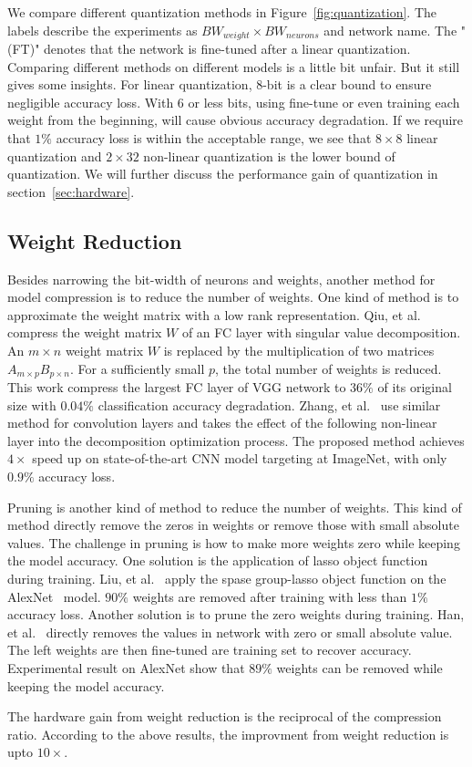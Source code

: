 We compare different quantization methods in Figure~\ref{fig:quantization}. The labels describe the experiments as $BW_{weight}\times BW_{neurons}$ and network name. The "(FT)" denotes that the network is fine-tuned after a linear quantization. Comparing different methods on different models is a little bit unfair. But it still gives some insights. For linear quantization, 8-bit is a clear bound to ensure negligible accuracy loss. With 6 or less bits, using fine-tune or even training each weight from the beginning, will cause obvious accuracy degradation. If we require that $1\%$ accuracy loss is within the acceptable range, we see that $8\times8$ linear quantization and $2\times32$ non-linear quantization is the lower bound of quantization. We will further discuss the performance gain of quantization in section~\ref{sec:hardware}. 


\subsection{Weight Reduction}\label{sec:software:wr}
Besides narrowing the bit-width of neurons and weights, another method for model compression is to reduce the number of weights. One kind of method is to approximate the weight matrix with a low rank representation. Qiu, et al.~\cite{qiu2016going} compress the weight matrix $W$ of an FC layer with singular value decomposition. An $m\times n$ weight matrix $W$ is replaced by the multiplication of two matrices $A_{m\times p}B_{p\times n}$. For a sufficiently small $p$, the total number of weights is reduced. This work compress the largest FC layer of VGG network to $36\%$ of its original size with $0.04\%$ classification accuracy degradation. Zhang, et al.~\cite{zhang2015efficient} use similar method for convolution layers and takes the effect of the following non-linear layer into the decomposition optimization process. The proposed method achieves $4\times$ speed up on state-of-the-art CNN model targeting at ImageNet, with only $0.9\%$ accuracy loss.

Pruning is another kind of method to reduce the number of weights. This kind of method directly remove the zeros in weights or remove those with small absolute values. The challenge in pruning is how to make more weights zero while keeping the model accuracy. One solution is the application of lasso object function during training. Liu, et al.~\cite{liu2015sparse} apply the spase group-lasso object function on the AlexNet~\cite{krizhevsky2012imagenet} model. $90\%$ weights are removed after training with less than $1\%$ accuracy loss. Another solution is to prune the zero weights during training. Han, et al.~\cite{han2015deep} directly removes the values in network with zero or small absolute value. The left weights are then fine-tuned are training set to recover accuracy. Experimental result on AlexNet show that $89\%$ weights can be removed while keeping the model accuracy.

The hardware gain from weight reduction is the reciprocal of the compression ratio. According to the above results, the improvment from weight reduction is upto $10\times$.